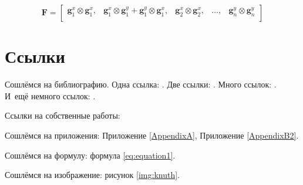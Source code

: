 \begin{equation}
    \mathbf{F} =
    \begin{bmatrix}
        \mathbf{g}_1^x \otimes \mathbf{g}_1^x, &
        \mathbf{g}_1^x \otimes \mathbf{g}_1^y + \mathbf{g}_1^y \otimes \mathbf{g}_1^x, &
        \mathbf{g}_2^x \otimes \mathbf{g}_2^x, &
        \dots, & \mathbf{g}_n^y \otimes \mathbf{g}_n^y \\
    \end{bmatrix}
\end{equation}


\section{Ссылки} \label{sect1_2}
Сошлёмся на библиографию.
Одна ссылка: \cite[с.~54]{Sokolov}\cite[с.~36]{Gaidaenko}.
Две ссылки: \cite{Sokolov,Gaidaenko}.
Много ссылок: %
\cite{Lermontov,Management,Borozda,Marketing,Constitution,FamilyCode,Gost.7.0.53,Razumovski,Lagkueva,Pokrovski,Sirotko,Lukina,Methodology,Encyclopedia,Nasirova,Berestova,Kriger}.
И~ещё немного ссылок:
\cite{Article,Book,Booklet,Conference,Inbook,Incollection,Manual,Mastersthesis,Misc,Phdthesis,Proceedings,Techreport,Unpublished}.
\cite{medvedev2006jelektronnye, CEAT:CEAT581, doi:10.1080/01932691.2010.513279,Gosele1999161,Li2007StressAnalysis, Shoji199895,test:eisner-sample,AB_patent_Pomerantz_1968,iofis_patent1960}



Ссылки на собственные работы:~\cite{vakbib1, confbib1}

Сошлёмся на приложения: Приложение \ref{AppendixA}, Приложение \ref{AppendixB2}.

Сошлёмся на формулу: формула \eqref{eq:equation1}.

Сошлёмся на изображение: рисунок \ref{img:knuth}.

